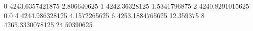0 4243.6357421875 2.806640625
1 4242.36328125 1.5341796875
2 4240.8291015625 0.0
4 4244.986328125 4.1572265625
6 4253.1884765625 12.359375
8 4265.3330078125 24.50390625
